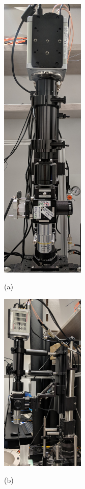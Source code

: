 \begin{figure}[htb]
	\begin{minipage}[t]{0.32\linewidth}\centering
		\includegraphics[width=4cm]{2_body/figures/setup4-front.jpg}
		\centerline{(a)}
	\end{minipage}
	\hfill
	\begin{minipage}[t]{0.32\linewidth}\centering
		\includegraphics[width=4cm]{2_body/figures/setup4-side.jpg}
		\centerline{(b)}
	\end{minipage}

\end{figure}
